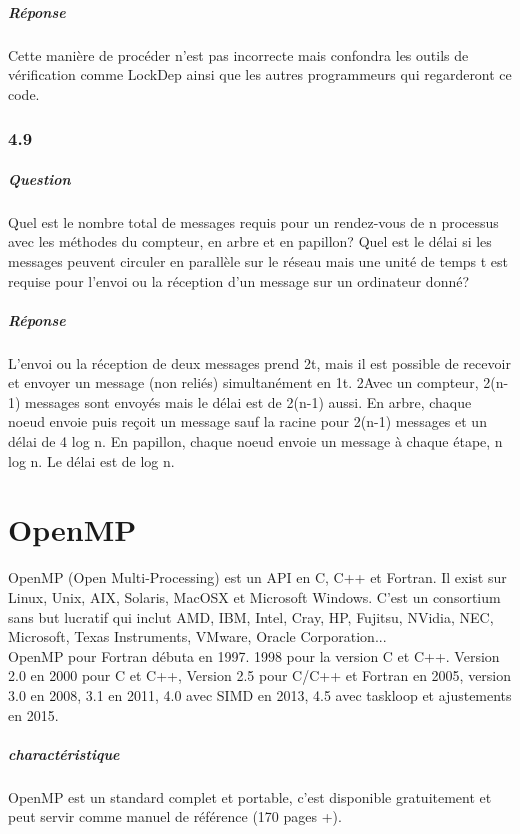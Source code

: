 \documentclass[oneside]{book}
\begin{document}
\paragraph{Réponse}
Cette manière de procéder n'est pas incorrecte mais confondra les outils de
vérification comme LockDep ainsi que les autres programmeurs qui regarderont
ce code.
\subsection{4.9}
\paragraph{Question}
Quel est le nombre total de messages requis pour un rendez-vous de n processus
avec les méthodes du compteur, en arbre et en papillon? Quel est le délai si les
messages peuvent circuler en parallèle sur le réseau mais une unité de temps t
est requise pour l'envoi ou la réception d'un message sur un ordinateur donné?
\paragraph{Réponse}
L'envoi ou la réception de deux messages prend 2t, mais il est possible de
recevoir et envoyer un message (non reliés) simultanément en 1t.
2Avec un compteur, 2(n-1) messages sont envoyés mais le délai est de 2(n-1)
aussi. En arbre, chaque noeud envoie puis reçoit un message sauf la racine pour
2(n-1) messages et un délai de 4 log n. En papillon, chaque noeud envoie un
message à chaque étape, n log n. Le délai est de log n.
\chapter{OpenMP}
OpenMP (Open Multi-Processing) est un API en C, C++ et Fortran. Il exist sur Linux, Unix, AIX, Solaris, MacOSX et Microsoft Windows. C'est un consortium sans but lucratif qui inclut AMD, IBM, Intel, Cray, HP, Fujitsu, NVidia, NEC, Microsoft, Texas Instruments, VMware, Oracle
Corporation...\\

OpenMP pour Fortran débuta en 1997. 1998 pour la version C et C++. Version 2.0 en 2000 pour C et C++, Version 2.5 pour C/C++ et
Fortran en 2005, version 3.0 en 2008, 3.1 en 2011, 4.0 avec SIMD en
2013, 4.5 avec taskloop et ajustements en 2015.\\

\paragraph{charactéristique}
OpenMP est un standard complet et portable, c'est disponible gratuitement et peut servir comme manuel de référence (170 pages +).\\
\end{document}
